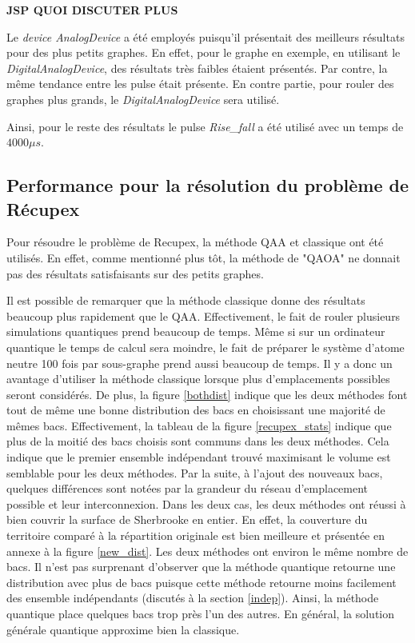 \documentclass[11pt]{article}
\begin{document}
\textbf{JSP QUOI DISCUTER PLUS}


Le \textit{device AnalogDevice} a été employés puisqu'il présentait des meilleurs résultats pour des plus petits graphes. En effet, pour le graphe en exemple, en utilisant le \textit{DigitalAnalogDevice}, des résultats très faibles étaient présentés. Par contre, la même tendance entre les pulse était présente. En contre partie, pour rouler des graphes plus grands, le \textit{DigitalAnalogDevice} sera utilisé.

Ainsi, pour le reste des résultats le pulse \textit{Rise\_fall} a été utilisé avec un temps de $4000 \mu s$.

\subsection{Performance pour la résolution du problème de Récupex}
Pour résoudre le problème de Recupex, la méthode QAA et classique ont été utilisés. En effet, comme mentionné plus tôt, la méthode de "QAOA" ne donnait pas des résultats satisfaisants sur des petits graphes. 

Il est possible de remarquer que la méthode classique donne des résultats beaucoup plus rapidement que le QAA. Effectivement, le fait de rouler plusieurs simulations quantiques prend beaucoup de temps. Même si sur un ordinateur quantique le temps de calcul sera moindre, le fait de préparer le système d'atome neutre 100 fois par sous-graphe prend aussi beaucoup de temps. Il y a donc un avantage d'utiliser la méthode classique lorsque plus d'emplacements possibles seront considérés. De plus, la figure \ref{bothdist} indique que les deux méthodes font tout de même une bonne distribution des bacs en choisissant une majorité de mêmes bacs. Effectivement, la tableau de la figure \ref{recupex_stats} indique que plus de la moitié des  bacs choisis sont communs dans les deux méthodes. Cela indique que le premier ensemble indépendant trouvé maximisant le volume est semblable pour les deux méthodes.  Par la suite, à l'ajout des nouveaux bacs, quelques différences sont notées par la grandeur du réseau d'emplacement possible et leur interconnexion. Dans les deux cas, les deux méthodes ont réussi à bien couvrir la surface de Sherbrooke en entier. En effet, la couverture du territoire comparé à la répartition originale est bien meilleure et présentée en annexe à la figure \ref{new_dist}. Les deux méthodes ont environ le même nombre de bacs. Il n'est pas surprenant d'observer que la méthode quantique retourne une distribution avec plus de bacs puisque cette méthode retourne moins facilement des ensemble indépendants (discutés à la section \ref{indep}). Ainsi, la méthode quantique place quelques bacs trop près l'un des autres. En général, la solution générale quantique approxime bien la classique.
\end{document}
